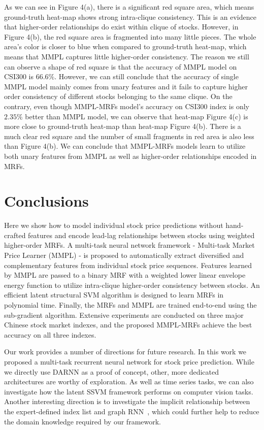 As we can see in Figure 4(a), there is a significant red square
area, which means ground-truth heat-map shows strong intra-clique
consistency. This is an evidence that higher-order relationships
do exist within clique of stocks. However, in Figure 4(b), the red
square area is fragmented into many little pieces. The whole
area's color is closer to blue when compared to ground-truth
heat-map, which means that MMPL captures little higher-order consistency.
The reason we still can observe a shape of red square
is that the accuracy of MMPL model on CSI300 is $66.6\%$.
However, we can still conclude that the accuracy of single MMPL
model mainly comes from unary features and it fails to capture
higher order consistency of different stocks belonging to the same clique.
On the contrary, even though MMPL-MRFs model's accuracy on CSI300
index is only $2.35\%$ better than MMPL model, we can observe
that heat-map Figure 4(c) is more close to ground-truth heat-map than
heat-map Figure 4(b). There is a much clear red square and the number of
small fragments in red area is also less than Figure 4(b). We can
conclude that MMPL-MRFs models learn to utilize both unary
features from MMPL as well as higher-order relationships encoded
in MRFs.

\section{Conclusions}
\label{sec:conc}

Here we show how to model individual stock price predictions without hand-crafted features and encode lead-lag relationships between stocks using weighted higher-order MRFs. A multi-task neural network framework - Multi-task Market Price Learner (MMPL) - is proposed to automatically extract diversified and complementary features from individual stock price sequences. Features learned by MMPL are passed to a binary MRF with a weighted lower linear envelope energy function to utilize intra-clique higher-order consistency between stocks. An efficient latent structural SVM algorithm is designed to learn MRFs in polynomial time. Finally, the MRFs and MMPL are trained end-to-end using the sub-gradient algorithm. Extensive experiments are conducted on three major Chinese stock market indexes, and the proposed MMPL-MRFs achieve the best accuracy on all three indexes.

Our work provides a number of directions for future research. In this work we proposed a multi-task recurrent neural network for stock price prediction. While we directly use DARNN as a proof of concept, other, more dedicated architectures are worthy of exploration. As well as time series tasks, we can also investigate how the latent SSVM framework performs on computer vision tasks. Another interesting direction is to investigate the implicit relationship between the expert-defined index list and graph RNN~\cite{you2018graphrnn}, which could further help to reduce the domain knowledge required by our framework.


